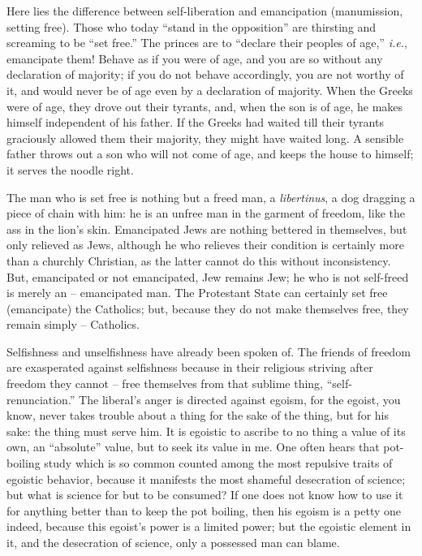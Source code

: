\documentclass[12pt,a4paper]{book}
\begin{document}
Here lies the difference between self-liberation and emancipation 
(manumission, setting free). Those who today ``stand in the opposition'' are 
thirsting and screaming to be ``set free.'' The princes are to ``declare 
their peoples of age,'' \textit{i.e.}, emancipate them! Behave as if you 
were of age, and you are so without any declaration of majority; if you do not 
behave accordingly, you are not worthy of it, and would never be of age even 
by a declaration of majority. When the Greeks were of age, they drove out 
their tyrants, and, when the son is of age, he makes himself independent of 
his father. If the Greeks had waited till their tyrants graciously allowed 
them their majority, they might have waited long. A sensible father throws out 
a son who will not come of age, and keeps the house to himself; it serves the 
noodle right.

The man who is set free is nothing but a freed man, a \textit{libertinus}, a 
dog dragging a piece of chain with him: he is an unfree man in the garment of 
freedom, like the ass in the lion's skin. Emancipated Jews are nothing 
bettered in themselves, but only relieved as Jews, although he who relieves 
their condition is certainly more than a churchly Christian, as the latter 
cannot do this without inconsistency. But, emancipated or not emancipated, Jew 
remains Jew; he who is not self-freed is merely an -- emancipated man. The 
Protestant State can certainly set free (emancipate) the Catholics; but, 
because they do not make themselves free, they remain simply -- Catholics.

Selfishness and unselfishness have already been spoken of. The friends of 
freedom are exasperated against selfishness because in their religious 
striving after freedom they cannot -- free themselves from that sublime thing, 
``self-renunciation.'' The liberal's anger is directed against egoism, for 
the egoist, you know, never takes trouble about a thing for the sake of the 
thing, but for his sake: the thing must serve him. It is egoistic to ascribe 
to no thing a value of its own, an ``absolute'' value, but to seek its value 
in me. One often hears that pot-boiling study which is so common counted among 
the most repulsive traits of egoistic behavior, because it manifests the most 
shameful desecration of science; but what is science for but to be consumed? 
If one does not know how to use it for anything better than to keep the pot 
boiling, then his egoism is a petty one indeed, because this egoist's power is 
a limited power; but the egoistic element in it, and the desecration of 
science, only a possessed man can blame.
\end{document}
